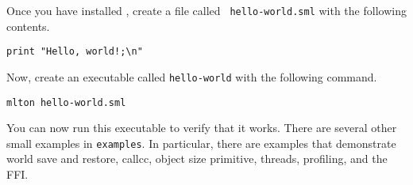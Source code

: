 Once you have installed {\mlton}, create a file called {\tt
hello-world.sml} with the following contents.

\begin{verbatim}
print "Hello, world!;\n"
\end{verbatim}
Now, create an executable called {\tt hello-world} with the following command.
\begin{verbatim}
mlton hello-world.sml
\end{verbatim}
You can now run this executable to verify that it works.  There are several
other small examples in {\tt examples}.  In particular, there are examples that
demonstrate world save and restore, callcc, object size primitive, threads,
profiling, and the FFI.
